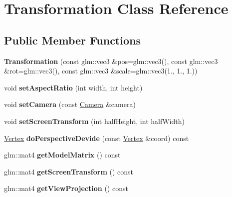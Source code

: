 \hypertarget{class_transformation}{}\section{Transformation Class Reference}
\label{class_transformation}
\subsection*{Public Member Functions}
\begin{DoxyCompactItemize}
\item 
\hypertarget{class_transformation_a9e066efd2a4d28a13d1bdb54de254bec}{}{\bfseries Transformation} (const glm\+::vec3 \&pos=glm\+::vec3(), const glm\+::vec3 \&rot=glm\+::vec3(), const glm\+::vec3 \&scale=glm\+::vec3(1., 1., 1.))\label{class_transformation_a9e066efd2a4d28a13d1bdb54de254bec}

\item 
\hypertarget{class_transformation_aba67dba23c6180e047f8172c461a7554}{}void {\bfseries set\+Aspect\+Ratio} (int width, int height)\label{class_transformation_aba67dba23c6180e047f8172c461a7554}

\item 
\hypertarget{class_transformation_a93295202dbfbb2b450d5bd893ee3237b}{}void {\bfseries set\+Camera} (const \hyperlink{class_camera}{Camera} \&camera)\label{class_transformation_a93295202dbfbb2b450d5bd893ee3237b}

\item 
\hypertarget{class_transformation_ae2dcb616a0231a331ed97a9ef5704849}{}void {\bfseries set\+Screen\+Transform} (int half\+Height, int half\+Width)\label{class_transformation_ae2dcb616a0231a331ed97a9ef5704849}

\item 
\hypertarget{class_transformation_a9bb89f79245297795c78f62ca6b29efd}{}\hyperlink{struct_vertex}{Vertex} {\bfseries do\+Perspective\+Devide} (const \hyperlink{struct_vertex}{Vertex} \&coord) const \label{class_transformation_a9bb89f79245297795c78f62ca6b29efd}

\item 
\hypertarget{class_transformation_a0a6033abab9c32b487c90b95fd1a2df3}{}glm\+::mat4 {\bfseries get\+Model\+Matrix} () const \label{class_transformation_a0a6033abab9c32b487c90b95fd1a2df3}

\item 
\hypertarget{class_transformation_a4d2b0cd9862c2b0485740a896617c867}{}glm\+::mat4 {\bfseries get\+Screen\+Transform} () const \label{class_transformation_a4d2b0cd9862c2b0485740a896617c867}

\item 
\hypertarget{class_transformation_a5f57370067951aecad8b40bec887c2ef}{}glm\+::mat4 {\bfseries get\+View\+Projection} () const \label{class_transformation_a5f57370067951aecad8b40bec887c2ef}

\end{DoxyCompactItemize}
